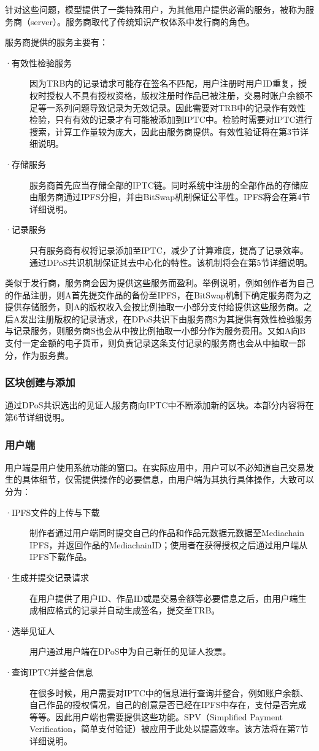 \documentclass[withoutpreface,bwprint]{cumcmthesis} %
\begin{document}
针对这些问题，模型提供了一类特殊用户，为其他用户提供必需的服务，被称为服务商（server）。服务商取代了传统知识产权体系中发行商的角色。

服务商提供的服务主要有：
\begin{description}
	\item[·有效性检验服务] 因为TRB内的记录请求可能存在签名不匹配，用户注册时用户ID重复，授权时授权人不具有授权资格，版权注册时作品已被注册，交易时账户余额不足等一系列问题导致记录为无效记录。因此需要对TRB中的记录作有效性检验，只有有效的记录才有可能被添加到IPTC中。检验时需要对IPTC进行搜索，计算工作量较为庞大，因此由服务商提供。有效性验证将在第3节详细说明。
	\item[·存储服务] 服务商首先应当存储全部的IPTC链。同时系统中注册的全部作品的存储应由服务商通过IPFS分担，并由BitSwap机制保证公平性。IPFS将会在第4节详细说明。
	\item[·记录服务] 只有服务商有权将记录添加至IPTC，减少了计算难度，提高了记录效率。通过DPoS共识机制保证其去中心化的特性。该机制将会在第5节详细说明。
\end{description}

类似于发行商，服务商会因为提供这些服务而盈利。举例说明，例如创作者为自己的作品注册，则A首先提交作品的备份至IPFS，在BitSwap机制下确定服务商为之提供存储服务，则A的版权收入会按比例抽取一小部分支付给提供这些服务商。之后A发出注册版权的记录请求，在DPoS共识下由服务商S为其提供有效性检验服务与记录服务，则服务商S也会从中按比例抽取一小部分作为服务费用。又如A向B支付一定金额的电子货币，则负责记录这条支付记录的服务商也会从中抽取一部分，作为服务费。

\subsubsection{区块创建与添加}
通过DPoS共识选出的见证人服务商向IPTC中不断添加新的区块。本部分内容将在第6节详细说明。

\subsubsection{用户端}
用户端是用户使用系统功能的窗口。在实际应用中，用户可以不必知道自己交易发生的具体细节，仅需提供操作的必要信息，由用户端为其执行具体操作，大致可以分为：
\begin{description}
	\item[·IPFS文件的上传与下载] 制作者通过用户端同时提交自己的作品和作品元数据元数据至Mediachain IPFS，并返回作品的MediachainID；使用者在获得授权之后通过用户端从IPFS下载作品。
	\item[·生成并提交记录请求] 在用户提供了用户ID、作品ID或是交易金额等必要信息之后，由用户端生成相应格式的记录并自动生成签名，提交至TRB。
	\item[·选举见证人] 用户通过用户端在DPoS中为自己新任的见证人投票。
	\item[·查询IPTC并整合信息] 在很多时候，用户需要对IPTC中的信息进行查询并整合，例如账户余额、自己作品的授权情况，自己的创意是否已经在IPFS中存在，支付是否完成等等。因此用户端也需要提供这些功能。SPV（Simplified Payment Verification，简单支付验证）被应用于此处以提高效率。该方法将在第7节详细说明。
\end{description}
\end{document}
